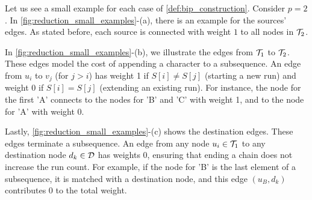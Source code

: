 \begin{example}[Edges]
    Let us see a small example for each case of \cref{def:bip_construction}. Consider $p=2$. In \cref{fig:reduction_small_examples}-(a), there is an example for the sources' edges. As stated before, each source is connected with weight $1$ to all nodes in $\mathcal{T}_{2}$.

    In \cref{fig:reduction_small_examples}-(b), we illustrate the edges from $\mathcal{T}_{1}$ to $\mathcal{T}_{2}$. These edges model the cost of appending a character to a subsequence. An edge from $u_i$ to $v_j$ (for $j>i$) has weight 1 if $S[i] \neq S[j]$ (starting a new run) and weight 0 if $S[i] = S[j]$ (extending an existing run). For instance, the node for the first 'A' connects to the nodes for 'B' and 'C' with weight 1, and to the node for 'A' with weight 0.

    Lastly, \cref{fig:reduction_small_examples}-(c) shows the destination edges. These edges terminate a subsequence. An edge from any node $u_i \in \mathcal{T}_{1}$ to any destination node $d_k \in \mathcal{D}$ has weights 0, ensuring that ending a chain does not increase the run count. For example, if the node for 'B' is the last element of a subsequence, it is matched with a destination node, and this edge $(u_B, d_k)$ contributes 0 to the total weight.

    \begin{figure}[H]
        \centering
        \begin{subfigure}[b]{0.3\textwidth}
            \centering
\end{subfigure}
\end{figure}
\end{example}
